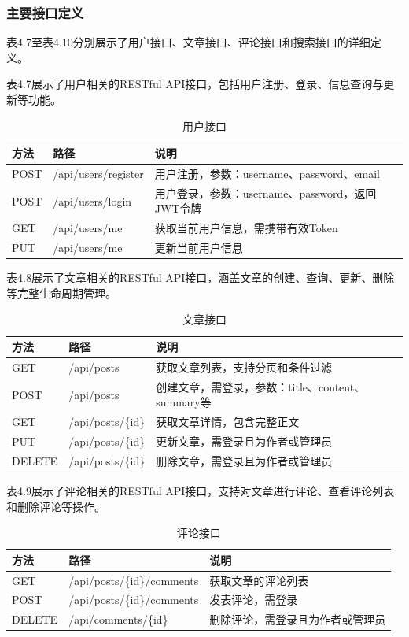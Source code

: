 \documentclass[UTF8,AutoFakeBold=1,AutoFakeSlant,zihao=-4]{SCAU}
\begin{document}
\subsubsection{主要接口定义}

表4.7至表4.10分别展示了用户接口、文章接口、评论接口和搜索接口的详细定义。

表4.7展示了用户相关的RESTful API接口，包括用户注册、登录、信息查询与更新等功能。

\begin{table}[htbp]
\centering
\caption{用户接口}
\begin{tabular}{p{2.5cm}p{3cm}p{6cm}}
\toprule
方法 & 路径 & 说明 \\
\midrule
POST & /api/users/register & 用户注册，参数：username、password、email \\
POST & /api/users/login & 用户登录，参数：username、password，返回JWT令牌 \\
GET & /api/users/me & 获取当前用户信息，需携带有效Token \\
PUT & /api/users/me & 更新当前用户信息 \\
\bottomrule
\end{tabular}
\end{table}

表4.8展示了文章相关的RESTful API接口，涵盖文章的创建、查询、更新、删除等完整生命周期管理。

\begin{table}[htbp]
\centering
\caption{文章接口}
\begin{tabular}{p{2.5cm}p{4cm}p{5cm}}
\toprule
方法 & 路径 & 说明 \\
\midrule
GET & /api/posts & 获取文章列表，支持分页和条件过滤 \\
POST & /api/posts & 创建文章，需登录，参数：title、content、summary等 \\
GET & /api/posts/\{id\} & 获取文章详情，包含完整正文 \\
PUT & /api/posts/\{id\} & 更新文章，需登录且为作者或管理员 \\
DELETE & /api/posts/\{id\} & 删除文章，需登录且为作者或管理员 \\
\bottomrule
\end{tabular}
\end{table}

表4.9展示了评论相关的RESTful API接口，支持对文章进行评论、查看评论列表和删除评论等操作。

\begin{table}[htbp]
\centering
\caption{评论接口}
\begin{tabular}{p{2.5cm}p{4.5cm}p{4.5cm}}
\toprule
方法 & 路径 & 说明 \\
\midrule
GET & /api/posts/\{id\}/comments & 获取文章的评论列表 \\
POST & /api/posts/\{id\}/comments & 发表评论，需登录 \\
DELETE & /api/comments/\{id\} & 删除评论，需登录且为作者或管理员 \\
\bottomrule
\end{tabular}
\end{table}
\end{document}
